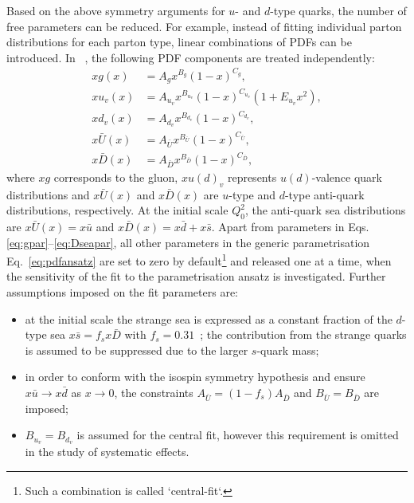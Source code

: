Based on the above symmetry arguments for $u$- and $d$-type quarks, the number of free parameters can be reduced. For example, instead of fitting individual parton distributions for each parton type, linear combinations of PDFs can be introduced.  In ~\cite{Aaron:2009aa}, the following PDF components are treated independently:
\begin{align}
 xg\left(x\right) &= A_gx^{B_g}\left(1-x\right)^{C_g}, \label{eq:gpar} \\
 xu_v\left(x\right) &= A_{u_v}x^{B_{u_v}}\left(1-x\right)^{C_{u_v}}\left(1+E_{u_v}x^2\right),\\
 xd_v\left(x\right) &= A_{d_v}x^{B_{d_v}}\left(1-x\right)^{C_{d_v}},\\
 x\bar{U}\left(x\right) &= A_{\bar{U}}x^{B_{\bar{U}}}\left(1-x\right)^{C_{\bar{U}}},\\
 x\bar{D}\left(x\right) &= A_{\bar{D}}x^{B_{\bar{D}}}\left(1-x\right)^{C_{\bar{D}}}, \label{eq:Dseapar}
\end{align}
where $xg$ corresponds to the gluon, $xu\left(d\right)_v$ represents $u\left(d\right)$-valence quark distributions and $x\bar{U}\left(x\right)$ and $x\bar{D}\left(x\right)$ are $u$-type and $d$-type anti-quark distributions, respectively. At the initial scale $Q^2_0$, the anti-quark sea distributions are $x\bar{U}\left(x\right)=x\bar u$ and $x\bar{D}\left(x\right)=x\bar d+x\bar s$. Apart from parameters in Eqs.\eqref{eq:gpar}--\eqref{eq:Dseapar}, all other parameters in the generic parametrisation Eq.~\eqref{eq:pdfansatz} are set to zero by default\footnote{Such a combination is called `central-fit`.} and released one at a time, when the sensitivity of the fit to the parametrisation ansatz is investigated. Further assumptions imposed on the fit parameters are:
\begin{itemize}
 \item at the initial scale the strange sea is expressed as a constant fraction of the $d$-type sea $x\bar s=f_s x \bar D$ with $f_s=0.31$~\cite{Martin:2009iq,Nadolsky:2008zw}; the contribution from the strange quarks is assumed to be suppressed due to the larger $s$-quark mass;
 \item in order to conform with the isospin symmetry hypothesis and ensure $x\bar u \rightarrow x\bar d$ as $x\rightarrow 0$, the constraints $A_{\bar U}=\left(1-f_s\right)A_{\bar D}$ and $B_{\bar{U}}=B_{\bar{D}}$ are imposed;
 \item $B_{u_v}=B_{d_v}$ is assumed for the central fit, however this requirement is omitted in the study of systematic effects.
\end{itemize}
